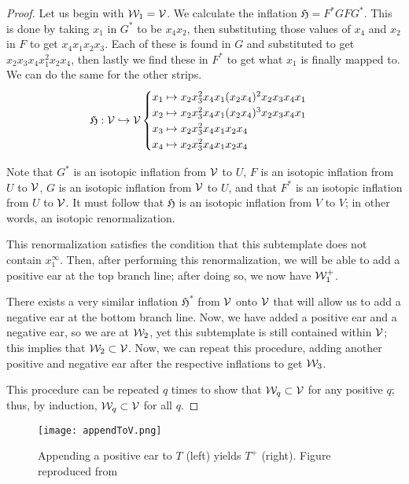 \documentclass[paper.tex]{subfiles}
\begin{document}
\begin{proof}
Let us begin with $\mathcal{W}_1 = \mathcal{V}$. We calculate the inflation $\mathfrak{H} = F^* G F G^*$. This is done by taking $x_1$ in $G^*$ to be $x_4 x_2$, then substituting those values of $x_4$ and $x_2$ in $F$ to get $x_4 x_1 x_2 x_3$. Each of these is found in $G$ and substituted to get $x_2 x_3 x_4 x_1^2 x_2 x_4$, then lastly we find these in $F^*$ to get what $x_1$ is finally mapped to. We can do the same for the other strips.
    $$\mathfrak{H}: \mathcal{V} \hookrightarrow \mathcal{V} \begin{cases}
        x_1 \mapsto x_2 x_3^2 x_4 x_1 (x_2 x_4)^2 x_2 x_3 x_4 x_1 \\
        x_2 \mapsto x_2 x_3^2 x_4 x_1 (x_2 x_4)^3 x_2 x_3 x_4 x_1 \\
        x_3 \mapsto x_2 x_3^2 x_4 x_1  x_2 x_4  \\
        x_4 \mapsto x_2 x_3^2 x_4 x_1  x_2 x_4  \end{cases} $$

        Note that $G^*$ is an isotopic inflation from $\mathcal{V}$ to $U$, $F$ is an isotopic inflation from $U$ to $\mathcal{V}$, $G$ is an isotopic inflation from $\mathcal{V}$ to $U$, and that $F^*$ is an isotopic inflation from $U$ to $\mathcal{V}$. It must follow that $\mathfrak{H}$ is an isotopic inflation from $V$ to $V$; in other words, an isotopic renormalization.

        This renormalization satisfies the condition that this subtemplate does not contain $x_1^\infty$. Then, after performing this renormalization, we will be able to add a positive ear at the top branch line; after doing so, we now have $\mathcal{W}_1^+$.

        There exists a very similar inflation $\mathfrak{H}^*$ from $\mathcal{V}$ onto $\mathcal{V}$ that will allow us to add a negative ear at the bottom branch line. Now, we have added a positive ear and a negative ear, so we are at $\mathcal{W}_2$, yet this subtemplate is still contained within $\mathcal{V}$; this implies that $\mathcal{W}_2 \subset \mathcal{V}$. Now, we can repeat this procedure, adding another positive and negative ear after the respective inflations to get $\mathcal{W}_3$.

        This procedure can be repeated $q$ times to show that $\mathcal{W}_q \subset \mathcal{V}$ for any positive $q$; thus, by induction, $\mathcal{W}_q \subset \mathcal{V}$ for all $q$.
    \end{proof}


\begin{figure}[h]
    \centering
    \texttt{[image: appendToV.png]}
    \caption{Appending a positive ear to $T$ (left) yields $T^+$ (right). Figure reproduced from~\cite{Ghrist1996}} \label{fig:appendToV} %
\end{figure}
\end{document}
